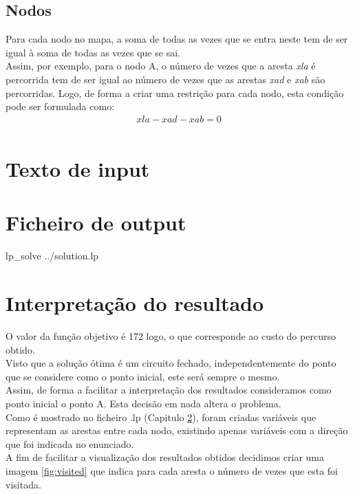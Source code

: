 \documentclass[a4paper]{report}
\begin{document}
\section{Nodos}
Para cada nodo no mapa, a soma de todas as vezes que se entra neste
tem de ser igual à soma de todas as vezes que se sai.\\
Assim, por exemplo, para o nodo A, o número de vezes que a aresta
\textit{xla} é percorrida tem de ser igual ao número de vezes que
as arestas \textit{xad} e \textit{xab} são percorridas.
Logo, de forma a criar uma restrição para cada nodo, esta condição
pode ser formulada como:\\
\begin{multline}
xla- xad - xab = 0 \\
\end{multline}

\chapter{Texto de input}
\label{input}


\chapter{Ficheiro de output}
\label{output}
\bash[stdout]
lp_solve ../solution.lp
\END

\chapter{Interpretação do resultado}
\label{solution}
O valor da função objetivo é 172 logo, o que corresponde ao custo do percurso
obtido.\\
Visto que a solução ótima é um circuito fechado, independentemente do ponto
que se considere como o ponto inicial, este será sempre o mesmo. \\
Assim, de forma a facilitar a interpretação dos resultados consideramos como ponto
inicial o ponto A. Esta decisão em nada altera o problema.\\
Como é mostrado no ficheiro .lp (Capitulo \ref{input}), foram criadas variáveis
que representam as arestas entre cada nodo, existindo apenas variáveis com a direção 
que foi indicada no enunciado. \\
A fim de facilitar a visualização dos resultados obtidos decidimos criar uma
imagem \ref{fig:visited} que indica para cada aresta o número de vezes que esta
foi visitada.
\end{document}
